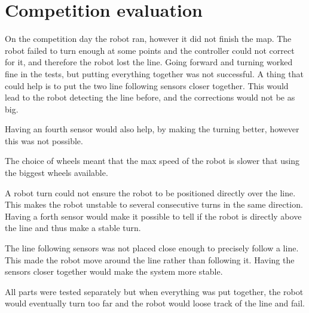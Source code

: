 \section{Competition evaluation}
On the competition day the robot ran, however it did not finish the map.
The robot failed to turn enough at some points and the controller could not correct for it, and therefore the robot lost the line.
Going forward and turning worked fine in the tests, but putting everything together was not successful.
A thing that could help is to put the two line following sensors closer together.
This would lead to the robot detecting the line before, and the corrections would not be as big. 

Having an fourth sensor would also help, by making the turning better, however this was not possible.

The choice of wheels meant that the max speed of the robot is slower that using the biggest wheels available.

A robot turn could not ensure the robot to be positioned directly over the line.
This makes the robot unstable to several consecutive turns in the same direction.
Having a forth sensor would make it possible to tell if the robot is directly above the line and thus make a stable turn.

The line following sensors was not placed close enough to precisely follow a line.
This made the robot move around the line rather than following it.
Having the sensors closer together would make the system more stable.

All parts were tested separately but when everything was put together, the robot would eventually turn too far and the robot would loose track of the line and fail.

